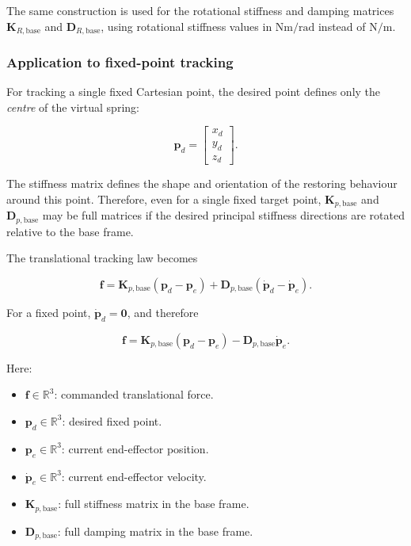 The same construction is used for the rotational stiffness and damping
matrices \(\mathbf{K}_{R,\mathrm{base}}\) and \(\mathbf{D}_{R,\mathrm{base}}\),
using rotational stiffness values in \(\mathrm{Nm/rad}\) instead of
\(\mathrm{N/m}\).

\subsubsection*{Application to fixed-point tracking}

For tracking a single fixed Cartesian point, the desired point defines only the
\emph{centre} of the virtual spring:

\begin{equation}
\label{eq:fixed_point_center}
\mathbf{p}_d =
\begin{bmatrix}
x_d\\y_d\\z_d
\end{bmatrix}.
\end{equation}

The stiffness matrix defines the shape and orientation of the restoring
behaviour around this point. Therefore, even for a single fixed target point,
\(\mathbf{K}_{p,\mathrm{base}}\) and \(\mathbf{D}_{p,\mathrm{base}}\) may be
full matrices if the desired principal stiffness directions are rotated
relative to the base frame.

The translational tracking law becomes

\begin{equation}
\label{eq:tracking_full_KD}
\mathbf{f}
=
\mathbf{K}_{p,\mathrm{base}}
(\mathbf{p}_d-\mathbf{p}_e)
+
\mathbf{D}_{p,\mathrm{base}}
(\dot{\mathbf{p}}_d-\dot{\mathbf{p}}_e).
\end{equation}

For a fixed point, \(\dot{\mathbf{p}}_d=\mathbf{0}\), and therefore

\begin{equation}
\label{eq:tracking_fixed_point_full_KD}
\mathbf{f}
=
\mathbf{K}_{p,\mathrm{base}}
(\mathbf{p}_d-\mathbf{p}_e)
-
\mathbf{D}_{p,\mathrm{base}}
\dot{\mathbf{p}}_e.
\end{equation}

Here:
\begin{itemize}
  \item \(\mathbf{f}\in\mathbb{R}^3\): commanded translational force.
  \item \(\mathbf{p}_d\in\mathbb{R}^3\): desired fixed point.
  \item \(\mathbf{p}_e\in\mathbb{R}^3\): current end-effector position.
  \item \(\dot{\mathbf{p}}_e\in\mathbb{R}^3\): current end-effector velocity.
  \item \(\mathbf{K}_{p,\mathrm{base}}\): full stiffness matrix in the base frame.
  \item \(\mathbf{D}_{p,\mathrm{base}}\): full damping matrix in the base frame.
\end{itemize}

